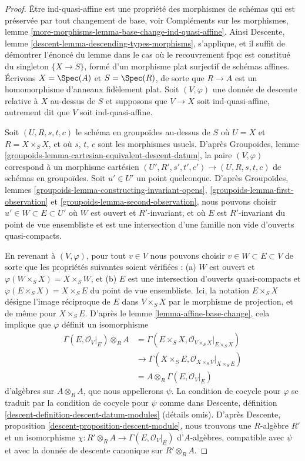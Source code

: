\begin{proof}
Être ind-quasi-affine est une propriété des morphismes de schémas
qui est préservée par tout changement de base, voir
Compléments sur les morphismes, lemme
\ref{more-morphisms-lemma-base-change-ind-quasi-affine}.
Ainsi Descente, lemme \ref{descent-lemma-descending-types-morphisms}, s'applique,
et il suffit de démontrer l'énoncé du lemme
dans le cas où le recouvrement fpqc est constitué du singleton
$\{X \to S\}$, formé d'un morphisme plat surjectif de schémas affines.
Écrivons $X = \Spec(A)$ et $S = \Spec(R)$, de sorte
que $R \to A$ est un homomorphisme d'anneaux fidèlement plat.
Soit $(V, \varphi)$ une donnée de descente relative à $X$ au-dessus de $S$
et supposons que $V \to X$ soit ind-quasi-affine, autrement dit que
$V$ soit ind-quasi-affine.

\medskip\noindent
Soit $(U, R, s, t, c)$ le schéma en groupoïdes au-dessus de $S$ où
$U = X$ et $R = X \times_S X$, et où $s$, $t$, $c$ sont les morphismes usuels.
D'après Groupoïdes, lemme \ref{groupoids-lemma-cartesian-equivalent-descent-datum},
la paire $(V, \varphi)$ correspond à un morphisme cartésien
$(U', R', s', t', c') \to (U, R, s, t, c)$ de schémas en groupoïdes.
Soit $u' \in U'$ un point quelconque. D'après
Groupoïdes, lemmes \ref{groupoids-lemma-constructing-invariant-opens},
\ref{groupoids-lemma-first-observation} et
\ref{groupoids-lemma-second-observation},
nous pouvons choisir $u' \in W \subset E \subset U'$
où $W$ est ouvert et $R'$-invariant, et où
$E$ est $R'$-invariant du point de vue ensembliste et
est une intersection d'une famille non vide d'ouverts quasi-compacts.

\medskip\noindent
En revenant à $(V, \varphi)$, pour tout $v \in V$ nous pouvons choisir
$v \in W \subset E \subset V$ de sorte que les propriétés suivantes soient vérifiées :
(a) $W$ est ouvert et $\varphi(W \times_S X) = X \times_S W$, et
(b) $E$ est une intersection d'ouverts quasi-compacts et
$\varphi(E \times_S X) = X \times_S E$ du point de vue ensembliste.
Ici, la notation $E \times_S X$ désigne
l'image réciproque de $E$ dans $V \times_S X$ par le morphisme de projection, et
de même pour $X \times_S E$. D'après le lemme \ref{lemma-affine-base-change},
cela implique que $\varphi$ définit un isomorphisme
\begin{align*}
\Gamma(E, \mathcal{O}_V|_E) \otimes_R A
& =
\Gamma(E \times_S X, \mathcal{O}_{V \times_S X}|_{E \times_S X}) \\
& \to
\Gamma(X \times_S E, \mathcal{O}_{X \times_S V}|_{X \times_S E}) \\
& =
A \otimes_R \Gamma(E, \mathcal{O}_V|_E)
\end{align*}
d'algèbres sur $A \otimes_R A$, que nous appellerons $\psi$.
La condition de cocycle pour $\varphi$
se traduit par la condition de cocycle pour $\psi$ comme dans
Descente, définition \ref{descent-definition-descent-datum-modules}
(détails omis). D'après Descente, proposition
\ref{descent-proposition-descent-module},
nous trouvons une $R$-algèbre $R'$ et un isomorphisme
$\chi : R' \otimes_R A \to \Gamma(E, \mathcal{O}_V|_E)$
d'$A$-algèbres, compatible avec $\psi$ et avec la
donnée de descente canonique sur $R' \otimes_R A$.


\end{proof}
